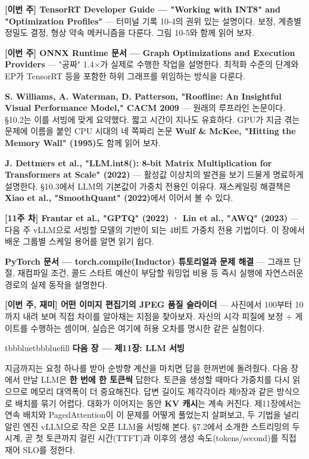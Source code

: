 \begin{tbbitemize}
  \item \textbf{[이번 주] TensorRT Developer Guide — "Working with INT8" and "Optimization Profiles"} — 터미널 기록 10-4의 권위 있는 설명이다. 보정, 계층별 정밀도 결정, 형상 약속 메커니즘을 다룬다. 그림 10-5와 함께 읽어 보자.
  \item \textbf{[이번 주] ONNX Runtime 문서 — Graph Optimizations and Execution Providers} — "공짜" 1.4×가 실제로 수행한 작업을 설명한다. 최적화 수준의 단계와 EP가 TensorRT 등을 포함한 하위 그래프를 위임하는 방식을 다룬다.
  \item \textbf{S. Williams, A. Waterman, D. Patterson, "Roofline: An Insightful Visual Performance Model," CACM 2009} — 원래의 루프라인 논문이다. §10.2는 이를 서빙에 맞게 요약했다. 짧고 시간이 지나도 유효하다. GPU가 지금 겪는 문제에 이름을 붙인 CPU 시대의 네 쪽짜리 논문 \textbf{Wulf \& McKee, "Hitting the Memory Wall" (1995)}도 함께 읽어 보자.
  \item \textbf{J. Dettmers et al., "LLM.int8(): 8-bit Matrix Multiplication for Transformers at Scale" (2022)} — 활성값 이상치의 발견을 보기 드물게 명료하게 설명한다. §10.3에서 LLM의 기본값이 가중치 전용인 이유다. 재스케일링 해결책은 \textbf{Xiao et al., "SmoothQuant" (2022)}에서 이어서 볼 수 있다.
  \item \textbf{[11주 차] Frantar et al., "GPTQ" (2022) · Lin et al., "AWQ" (2023)} — 다음 주 vLLM으로 서빙할 모델의 기반이 되는 4비트 가중치 전용 기법이다. 이 장에서 배운 그룹별 스케일 용어를 알면 읽기 쉽다.
  \item \textbf{PyTorch 문서 — torch.compile(Inductor) 튜토리얼과 문제 해결} — 그래프 단절, 재컴파일 조건, 콜드 스타트 예산이 부담할 워밍업 비용 등 즉시 실행에 자연스러운 경로의 실제 동작을 설명한다.
  \item \textbf{[이번 주, 재미] 어떤 이미지 편집기의 JPEG 품질 슬라이더} — 사진에서 100부터 10까지 내려 보며 직접 차이를 알아채는 지점을 찾아보자. 자신의 시각 피질에 보정 + 게이트를 수행하는 셈이며, 실습은 여기에 허용 오차를 명시한 같은 실험이다.
\end{tbbitemize}

\vspace{5.0pt}

\begin{calloutbox}{tbbblue}{tbbbluefill}
{\normalsize\bfseries\color{tbbblue}다음 장 — 제11장: LLM 서빙}\par\vspace{3pt}
지금까지는 요청 하나를 받아 순방향 계산을 마치면 답을 한꺼번에 돌려줬다. 다음 장에서 만날 LLM은 \textbf{한 번에 한 토큰씩} 답한다. 토큰을 생성할 때마다 가중치를 다시 읽으므로 메모리 대역폭이 더 중요해진다. 답변 길이도 제각각이라 제9장과 같은 방식으로 배치를 묶기 어렵다. 대화가 이어지는 동안 \textbf{KV 캐시}는 계속 커진다. 제11장에서는 연속 배치와 PagedAttention이 이 문제를 어떻게 풀었는지 살펴보고, 두 기법을 널리 알린 엔진 vLLM으로 작은 오픈 LLM을 서빙해 본다. §7.2에서 소개한 스트리밍의 두 시계, 곧 첫 토큰까지 걸린 시간(TTFT)과 이후의 생성 속도(tokens/second)를 직접 재어 SLO를 정한다.
\end{calloutbox}
